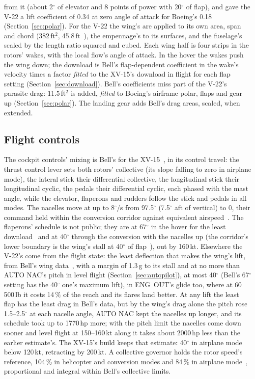 \documentclass[10pt,a4paper,twocolumn]{article}
\begin{document}
from it (about 2$^\circ$ of elevator and 8 points of power with 20$^\circ$ of flap), and gave the V-22 a lift coefficient of 0.34 at zero angle
of attack for Boeing's 0.18 (Section~\ref{sec:polar}). For the V-22 the wing's are applied to its own area, span and chord
(382\,ft$^2$, 45.8\,ft~\cite{rc}), the empennage's to its surfaces, and the fuselage's scaled by the length ratio squared and cubed. Each wing
half is four strips in the rotors' wakes, with the local flow's angle of attack. In the hover the wakes push the wing down; the
download is Bell's flap-dependent coefficient in the wake's velocity times a factor \emph{fitted} to the XV-15's download in flight
for each flap setting (Section~\ref{sec:download}). Bell's coefficients miss part of the V-22's parasite drag: 11.5\,ft$^2$ is added,
\emph{fitted} to Boeing's airframe polar, flaps and gear up (Section~\ref{sec:polar}). The landing gear adds Bell's drag areas, scaled,
when extended.

\subsection{Flight controls}
The cockpit controls' mixing is Bell's for the XV-15~\cite{cr}, in its control travel: the thrust control lever sets both rotors'
collective (its slope falling to zero in airplane mode), the lateral stick their differential collective, the longitudinal stick their
longitudinal cyclic, the pedals their differential cyclic, each phased with the mast angle, while the elevator, flaperons and rudders
follow the stick and pedals in all modes. The nacelles move at up to 8$^\circ$/s from 97.5$^\circ$ (7.5$^\circ$ aft of vertical) to 0, their
command held within the conversion corridor against equivalent airspeed~\cite{pd}. The flaperons' schedule is not public; they are at
67$^\circ$ in the hover for the least download~\cite{rc} and at 40$^\circ$ through the conversion with the nacelles up (the corridor's lower
boundary is the wing's stall at 40$^\circ$ of flap~\cite{pd}), out by 160\,kt. Elsewhere the V-22's come from the flight state: the
least deflection that makes the wing's lift, from Bell's wing data~\cite{cr}, with a margin of 1.3\,g to its stall and at no more than
AUTO NAC's pitch in level flight (Section~\ref{sec:autopilot}), at most 40$^\circ$ (Bell's 67$^\circ$ setting has the 40$^\circ$ one's
maximum lift), in ENG~OUT's glide too, where at 60\,500\,lb it costs 14\,\% of the reach and its flares land better. At any lift the least flap has the least drag in Bell's data, but by the wing's drag alone the pitch rose
1.5--2.5$^\circ$ at each nacelle angle, AUTO NAC kept the nacelles up longer, and its schedule took up to 1770\,hp more; with the pitch
limit the nacelles come down sooner and level flight at 150--160\,kt along it takes about 2000\,hp less than the earlier estimate's.
The XV-15's build keeps that estimate: 40$^\circ$ in airplane mode below 120\,kt, retracting by 200\,kt. A collective governor
holds the rotor speed's reference, 104\,\% in helicopter and conversion modes and 84\,\% in airplane mode~\cite{pd}, proportional and
integral within Bell's collective limits.
\end{document}
